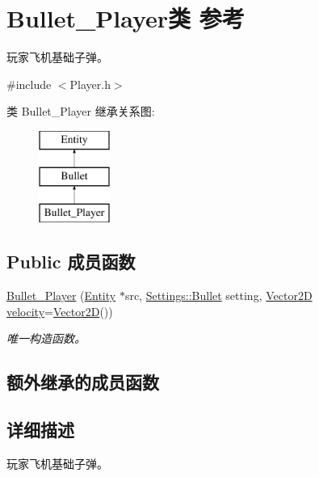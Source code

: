 \hypertarget{class_bullet___player}{}\section{Bullet\+\_\+\+Player类 参考}
\label{class_bullet___player}


玩家飞机基础子弹。  




{\ttfamily \#include $<$Player.\+h$>$}

类 Bullet\+\_\+\+Player 继承关系图\+:\begin{figure}[H]
\begin{center}
\leavevmode
\includegraphics[height=3.000000cm]{class_bullet___player}
\end{center}
\end{figure}
\subsection*{Public 成员函数}
\begin{DoxyCompactItemize}
\item 
\hyperlink{class_bullet___player_abcb87ef10b028f5fd603c70b4cda20d3}{Bullet\+\_\+\+Player} (\hyperlink{class_entity}{Entity} $\ast$src, \hyperlink{struct_settings_1_1_bullet}{Settings\+::\+Bullet} setting, \hyperlink{structbasic__vector2_d}{Vector2D} \hyperlink{class_entity_a386d25b56772b8913eb3e5adc636f6e0}{velocity}=\hyperlink{structbasic__vector2_d}{Vector2D}())
\begin{DoxyCompactList}\small\item\em 唯一构造函数。 \end{DoxyCompactList}\end{DoxyCompactItemize}
\subsection*{额外继承的成员函数}


\subsection{详细描述}
玩家飞机基础子弹。 

